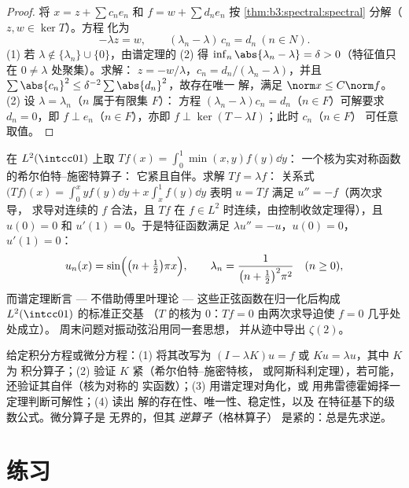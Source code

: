 \begin{proof}
将 $x = z + \sum c_ne_n$ 和 $f = w + \sum d_ne_n$ 按
\cref{thm:b3:spectral:spectral} 分解（$z, w \in \ker T$）。方程
化为
\[
-\lambda z = w, \qquad (\lambda_n - \lambda)\,c_n = d_n\
(n \in N).
\]
(1) 若 $\lambda \notin \{\lambda_n\}\cup\{0\}$，由谱定理的
(2) 得 $\inf_n\abs{\lambda_n - \lambda} = \delta >
0$（特征值只在 $0 \neq \lambda$ 处聚集）。求解：
$z = -w/\lambda$，$c_n = d_n/(\lambda_n - \lambda)$，并且
$\sum\abs{c_n}^2 \leq \delta^{-2}\sum\abs{d_n}^2$，故存在唯一
解，满足 $\norm x \leq C\norm f$。
(2) 设 $\lambda = \lambda_{n}$（$n$ 属于有限集 $F$）：
方程 $(\lambda_n - \lambda)c_n = d_n$（$n \in F$）可解要求
$d_n = 0$，即 $f \perp e_n$（$n \in F$），亦即 $f
\perp \ker(T - \lambda I)$；此时 $c_n$（$n \in F$）
可任意取值。
\end{proof}

\begin{example}\label{ex:b3:spectral:minxy}
在 $L^2(\intcc01)$ 上取 $Tf(x) = \int_0^1\min(x, y)f(y)\dd y$：
一个核为实对称函数的希尔伯特–施密特算子：
它紧且自伴。求解 $Tf = \lambda f$：
关系式 $\bigl(Tf\bigr)(x) = \int_0^xyf(y)\dd y +
x\int_x^1f(y)\dd y$ 表明 $u = Tf$ 满足 $u'' = -f$（两次求导，
求导对连续的 $f$ 合法，且 $Tf$ 在
$f \in L^2$ 时连续，由控制收敛定理得），且 $u(0)
= 0$ 和 $u'(1) = 0$。于是特征函数满足 $\lambda u'' =
-u$，$u(0) = 0$，$u'(1) = 0$：
\[
u_n(x) = \sin\Bigl(\bigl(n + \tfrac12\bigr)\pi x\Bigr),
\qquad
\lambda_n = \frac{1}{\bigl(n + \frac12\bigr)^2\pi^2}
\quad (n \geq 0),
\]
而谱定理断言 --- 不借助傅里叶理论 ---
这些正弦函数在归一化后构成 $L^2(\intcc01)$ 的标准正交基
（$T$ 的核为 $0$：$Tf = 0$
由两次求导迫使 $f = 0$ 几乎处处成立）。
周末问题对振动弦沿用同一套思想，
并从迹中导出 $\zeta(2)$。
\end{example}

\begin{method}\label{met:b3:spectral:method}
给定积分方程或微分方程：(1) 将其改写为
$(I - \lambda K)u = f$ 或 $Ku = \lambda u$，其中 $K$ 为
积分算子；(2) 验证 $K$ 紧（希尔伯特–施密特核，
或阿斯科利定理），若可能，还验证其自伴（核为对称的
实函数）；(3) 用谱定理对角化，或
用弗雷德霍姆择一定理判断可解性；(4) 读出
解的存在性、唯一性、稳定性，以及
在特征基下的级数公式。微分算子是
无界的，但其 \emph{逆算子}（格林算子）
是紧的：总是先求逆。
\end{method}

\section{练习}

